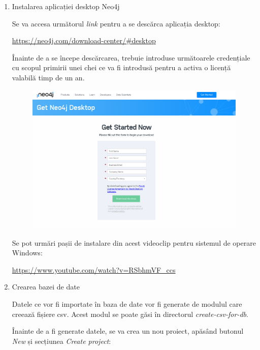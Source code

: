 \documentclass[12pt,a4paper]{report}
\begin{document}
\begin{enumerate}
  \item Instalarea aplicației desktop Neo4j
  
  Se va accesa următorul \emph{link} pentru a se descărca aplicația desktop: 
  
  \url{https://neo4j.com/download-center/#desktop}
  
  Înainte de a se începe descărcarea, trebuie introduse următoarele credențiale cu scopul primirii unei chei ce va fi introdusă pentru a activa o licență valabilă timp de un an.
  
  \begin{figure}[H]
\centering
\caption{}
\begin{adjustbox}{max size={\textwidth}{\textheight}}
\includegraphics[scale=1]{exemplu_41_neo4j_credentiale}
\end{adjustbox}
\caption*{}
\end{figure}

   
  Se pot urmări pașii de instalare din acest videoclip pentru sistemul de operare Windows:
  
  \url{https://www.youtube.com/watch?v=RSbhmVF_ccs}
  
  
  \item Crearea bazei de date
  
  Datele ce vor fi importate în baza de date vor fi generate de modulul care creează fișiere csv. Acest modul se poate găsi în directorul \emph{create-csv-for-db}.
  
  Înainte de a fi generate datele, se va crea un nou proiect, apăsând butonul \emph{New} și secțiunea \emph{Create project}:
  

\end{enumerate}
\end{document}
